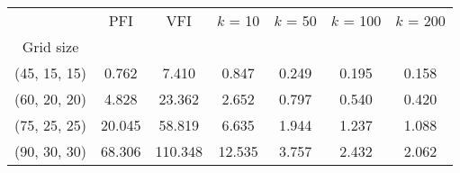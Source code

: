 \begin{tabular}{ccccccc}
\toprule
{} &     PFI &      VFI &  $k$ = 10 &  $k$ = 50 &  $k$ = 100 &  $k$ = 200 \\
Grid size    &         &          &           &           &            &            \\
\midrule
(45, 15, 15) &   0.762 &    7.410 &     0.847 &     0.249 &      0.195 &      0.158 \\
(60, 20, 20) &   4.828 &   23.362 &     2.652 &     0.797 &      0.540 &      0.420 \\
(75, 25, 25) &  20.045 &   58.819 &     6.635 &     1.944 &      1.237 &      1.088 \\
(90, 30, 30) &  68.306 &  110.348 &    12.535 &     3.757 &      2.432 &      2.062 \\
\bottomrule
\end{tabular}
